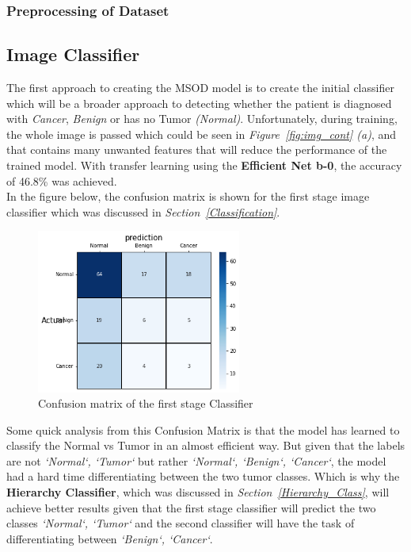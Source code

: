 \documentclass[12pt]{extarticle}
\begin{document}
	\subsubsection{Preprocessing of Dataset}
	
	\subsection{Image Classifier}
	The first approach to creating the MSOD model is to create the initial classifier which will be a broader approach to detecting whether the patient is diagnosed with \emph{Cancer}, \emph{Benign} or has no Tumor \emph{(Normal)}. Unfortunately, during training, the whole image is passed which could be seen in \emph{Figure~\ref{fig:img_cont} (a)}, and that contains many unwanted features that will reduce the performance of the trained model. With transfer learning using the \textbf{Efficient Net b-0}, the accuracy of 46.8\% was achieved.\\
	In the figure below, the confusion matrix is shown for the first stage image classifier which was discussed in \emph{Section~\ref{Classification}}.
	\begin{figure}[h]
		\centering
		\includegraphics[width=0.6\textwidth]{pics/Figures/1st_stage_conf_matrix.png}
		\caption{\small{Confusion matrix of the first stage Classifier}}
		\label{fig:conf-mat-first}
	\end{figure}
	Some quick analysis from this Confusion Matrix is that the model has learned to classify the Normal vs Tumor in an almost efficient way. But given that the labels are not \emph{`Normal`, `Tumor`} but rather \emph{`Normal`, `Benign`, `Cancer`}, the model had a hard time differentiating between the two tumor classes. Which is why the \textbf{Hierarchy Classifier}, which was discussed in \emph{Section~\ref{Hierarchy_Class}}, will achieve better results given that the first stage classifier will predict the two classes \emph{`Normal`, `Tumor`} and the second classifier will have the task of differentiating between \emph{`Benign`, `Cancer`}.
	
\end{document}

